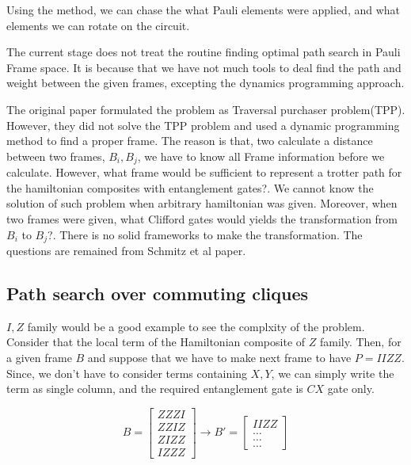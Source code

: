 \documentclass[a4paper,12pt]{article}
\begin{document}
Using the method, we can chase the what Pauli elements were applied, 
and what elements we can rotate on the circuit.




The current stage does not treat the routine finding 
optimal path search in Pauli Frame space.
It is because that we have not much tools to deal 
find the path and weight between the given frames,
excepting the dynamics programming approach.

The original paper formulated the problem as 
Traversal purchaser problem(TPP)\cite{schmitz_graph_2023}.
However, they did not solve the TPP problem and 
used a dynamic programming method to find a proper frame.
The reason is that, 
two calculate a distance between two frames, $B_i, B_j$, we have to know
all Frame information before we calculate.
However, what frame would be sufficient to represent a trotter path 
for the hamiltonian composites with entanglement gates?.
We cannot know the solution of such problem when arbitrary hamiltonian was given.
Moreover, when two frames were given, what Clifford gates would yields the 
transformation from $B_i$ to $B_j$?.
There is no solid frameworks to make the transformation.
The questions are remained from Schmitz et al paper.

\subsection{Path search over commuting cliques}

$I, Z$ family would be a good example to see the complxity
of the problem.
Consider that the local term of the Hamiltonian composite of $Z$ family.
Then, for a given frame $B$ and suppose that we have to make next frame to have $P = IIZZ$.
Since, we don't have to consider terms containing $X, Y$, we can simply write the term 
as single column, and the required entanglement gate is $CX$ gate only.

\begin{equation}
    B = \begin{bmatrix}
        ZZZI\\
        ZZIZ\\
        ZIZZ\\
        IZZZ
    \end{bmatrix}
    \rightarrow B' = \begin{bmatrix}
        IIZZ\\
        \dots\\
        \dots\\
        \dots
    \end{bmatrix}
\end{equation}
\end{document}
